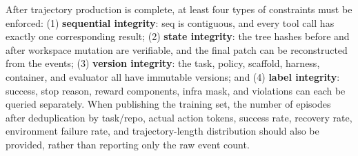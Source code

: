 \documentclass[10pt,a4paper,UTF8,fontset=none]{ctexart}
\newcommand{\ident}[1]{{\rmfamily #1}}
\begin{document}
After trajectory production is complete, at least four types of constraints must be enforced: (1) \textbf{sequential integrity}: \ident{seq} is contiguous, and every tool call has exactly one corresponding result; (2) \textbf{state integrity}: the tree hashes before and after workspace mutation are verifiable, and the final patch can be reconstructed from the events; (3) \textbf{version integrity}: the task, policy, scaffold, harness, container, and evaluator all have immutable versions; and (4) \textbf{label integrity}: success, stop reason, reward components, infra mask, and violations can each be queried separately. When publishing the training set, the number of episodes after deduplication by task/repo, actual action tokens, success rate, recovery rate, environment failure rate, and trajectory-length distribution should also be provided, rather than reporting only the raw event count.
\end{document}
